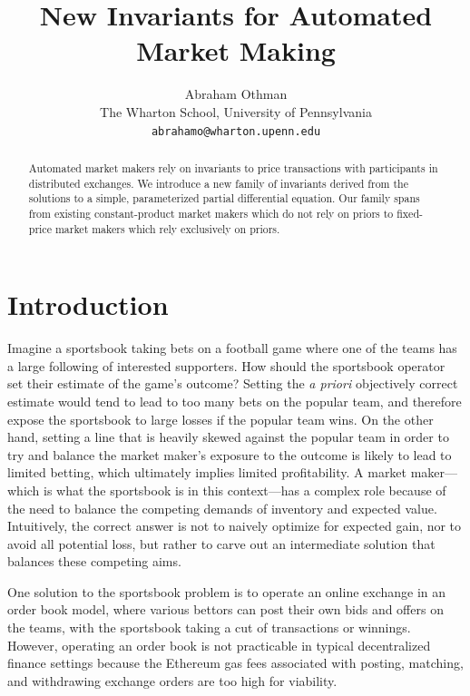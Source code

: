 \documentclass[11pt]{article}
\begin{document}
\title{New Invariants for Automated Market Making}

\author{Abraham Othman \\
        The Wharton School, University of Pennsylvania\\
       \texttt{abrahamo@wharton.upenn.edu}}

\maketitle

\begin{abstract}%
Automated market makers rely on invariants to price transactions with participants in distributed exchanges. We introduce a new family of invariants derived from the solutions to a  simple, parameterized partial differential equation. Our family spans from existing constant-product market makers which do not rely on priors to fixed-price market makers which rely exclusively on priors.
\end{abstract}


\section{Introduction}
Imagine a sportsbook taking bets on a football game where one of the teams has a large following of interested supporters. How should the sportsbook operator set their estimate of the game's outcome? Setting the \emph{a priori} objectively correct estimate would tend to lead to too many bets on the popular team, and therefore expose the sportsbook to large losses if the popular team wins. On the other hand, setting a line that is heavily skewed against the popular team in order to try and balance the market maker's exposure to the outcome is likely to lead to limited betting, which ultimately implies limited profitability. A market maker---which is what the sportsbook is in this context---has a complex role because of the need to balance the competing demands of inventory and expected value. Intuitively, the correct answer is not to naively optimize for expected gain, nor to avoid all potential loss, but rather to carve out an intermediate solution that balances these competing aims.

One solution to the sportsbook problem is to operate an online exchange in an order book model, where various bettors can post their own bids and offers on the teams, with the sportsbook taking a cut of transactions or winnings. However, operating an order book is not practicable in typical decentralized finance settings because the Ethereum gas fees associated with posting, matching, and withdrawing exchange orders are too high for viability.
\end{document}

